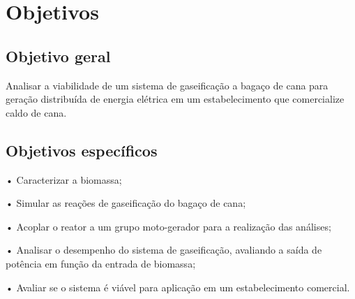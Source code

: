 \section{Objetivos}
\subsection{Objetivo geral}
Analisar a viabilidade de um sistema de gaseificação a bagaço de cana para geração distribuída de energia elétrica em um estabelecimento que comercialize caldo de cana.

\subsection{Objetivos específicos}

•	Caracterizar a biomassa;

•	Simular as reações de gaseificação do bagaço de cana;

•	Acoplar o reator a um grupo moto-gerador para a realização das análises;

•	Analisar o desempenho do sistema de gaseificação, avaliando a saída de potência em função da entrada de biomassa;

•	Avaliar se o sistema é viável para aplicação em um estabelecimento comercial.





